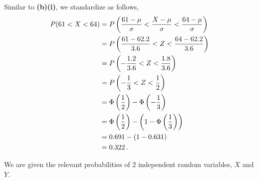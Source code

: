 \begin{subquestions}
\begin{subsubquestions}

\subsubquestion

Similar to \textbf{(b)(i)}, we standardize as follows,
\begin{align}
	P(61<X<64) & = P\left(\frac{61- \mu}{\sigma} < \frac{X - \mu}{\sigma} < \frac{64 - \mu}{\sigma} \right) \nonumber \\
	           & = P\left(\frac{61- 62.2}{3.6} < Z < \frac{64 - 62.2}{3.6} \right) \nonumber \\
	           & = P\left(-\frac{1.2}{3.6} < Z < \frac{1.8}{3.6} \right) \nonumber \\
	           & = P\left(-\frac{1}{3} < Z < \frac{1}{2} \right) \nonumber \\
	           & = \Phi\left(\frac{1}{2} \right) - \Phi\left(-\frac{1}{3}\right) \nonumber \\
	           & = \Phi\left(\frac{1}{2} \right) - \left(1 - \Phi\left(\frac{1}{3}\right) \right) \nonumber \\
	           & = 0.691 - (1 - 0.631) \nonumber \\
	           & = 0.322 \,.
\end{align}

\end{subsubquestions}


\subquestion

We are given the relevant probabilities of 2 independent random variables, $X$ and $Y$.

\begin{subsubquestions} 


\end{subsubquestions}
\end{subquestions}
